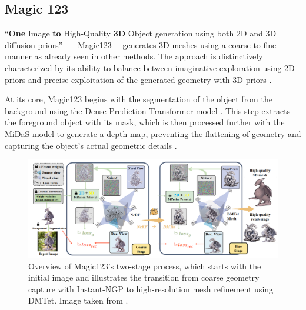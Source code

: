 \subsection{Magic 123}\label{Magic123}

``\textbf{One} Image \textbf{to} High-Quality \textbf{3D} Object generation using both 2D and 3D diffusion priors''~\citep{qian2023magic123}~-~Magic123~-~generates 3D meshes using a coarse-to-fine manner as already seen in other methods. The approach is distinctively characterized by its ability to balance between imaginative exploration  using 2D priors and precise exploitation of the generated geometry with 3D priors \citep{qian2023magic123}.

At its core, Magic123 begins with the segmentation of the object from the background using the Dense Prediction Transformer model \citep{ranftl2021vision}. This step extracts the foreground object with its mask, which is then processed further with the MiDaS \citep{ranftl2020robust} model to generate a depth map, preventing the flattening of geometry and capturing the object's actual geometric details \citep{qian2023magic123}.

\begin{figure}[ht]
  \centering
    \includegraphics[width=1\columnwidth]{figures/models/Magic123.png}
    \caption{Overview of Magic123's two-stage process, which starts with the initial image and illustrates the transition from coarse geometry capture with Instant-NGP to high-resolution mesh refinement using DMTet. Image taken from \citep{qian2023magic123}.}\label{fig:figureMagic123}
\end{figure}


